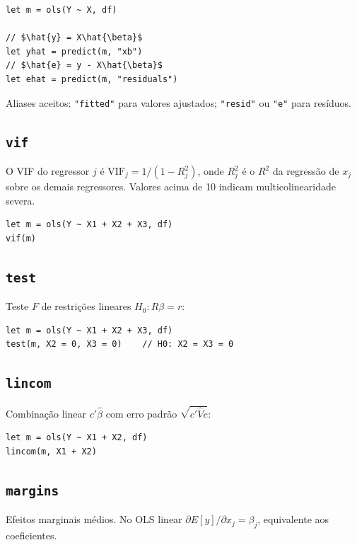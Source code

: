 \begin{lstlisting}
let m = ols(Y ~ X, df)

// $\hat{y} = X\hat{\beta}$
let yhat = predict(m, "xb")
// $\hat{e} = y - X\hat{\beta}$
let ehat = predict(m, "residuals")
\end{lstlisting}

Aliases aceitos: \texttt{"fitted"} para valores ajustados; \texttt{"resid"} ou \texttt{"e"} para resíduos.

\subsection{\texttt{vif}}

O VIF do regressor $j$ é $\mathrm{VIF}_j = 1/(1 - R_j^2)$, onde $R_j^2$ é o
$R^2$ da regressão de $x_j$ sobre os demais regressores. Valores acima de 10
indicam multicolinearidade severa.

\begin{lstlisting}
let m = ols(Y ~ X1 + X2 + X3, df)
vif(m)
\end{lstlisting}

\subsection{\texttt{test}}

Teste $F$ de restrições lineares $H_0: R\beta = r$:

\begin{lstlisting}
let m = ols(Y ~ X1 + X2 + X3, df)
test(m, X2 = 0, X3 = 0)    // H0: X2 = X3 = 0
\end{lstlisting}

\subsection{\texttt{lincom}}

Combinação linear $c'\hat{\beta}$ com erro padrão $\sqrt{c'\hat{V}c}$:

\begin{lstlisting}
let m = ols(Y ~ X1 + X2, df)
lincom(m, X1 + X2)
\end{lstlisting}

\subsection{\texttt{margins}}

Efeitos marginais médios. No OLS linear $\partial E[y]/\partial x_j = \beta_j$,
equivalente aos coeficientes.

